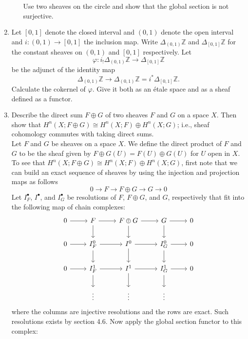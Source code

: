 \documentclass{article}
\newcommand{\zed}{\mathbb Z}
\begin{document}
\begin{enumerate}
\begin{enumerate}
Use two sheaves on the circle and show that the global section is not surjective.


\end{enumerate}
 \newpage
 \item 
Let $[0, 1]$ denote the closed interval and $(0, 1)$ denote the open
interval and $i: (0, 1) \to [0, 1]$ the inclusion map. Write $\Delta_{(0,1)}\zed$
and $\Delta_{[0,1]}\zed$ for the constant sheaves on $(0,1)$ and $[0,1]$ respectively. Let
$$\varphi: i_!\Delta_{(0,1)}\zed \to \Delta_{[0,1]}\zed$$
be the adjunct of the identity map
$$\Delta_{(0,1)}\zed \to \Delta_{(0,1)}\zed = i^*\Delta_{[0,1]}\zed.$$
Calculate the cokernel of $\varphi$. Give it both as an \'etale space and
as a sheaf defined as a functor.
\newpage
\item
Describe the direct sum $F\oplus G$ of two sheaves $F$ and $G$ on a space $X$.
Then show that $H^n(X;F\oplus G)\cong H^n(X;F)\oplus H^n(X;G)$; i.e., sheaf cohomology commutes with taking direct sums.\\

Let $F$ and $G$ be sheaves on a space $X$. We define the direct product of $F$ and $G$ to be the sheaf given by $F \oplus G (U) = F(U) \oplus G(U)$ for $U$ open in $X$. To see that $H^n(X;F\oplus G)\cong H^n(X;F)\oplus H^n(X;G)$, first note that we can build an exact sequence of sheaves by using the injection and projection maps as follows
\[0 \rightarrow F \rightarrow F \oplus G \rightarrow G \rightarrow 0 \]
Let $I^\bullet_F$, $I^\bullet$, and $I^\bullet_G$ be  resolutions of $F$, $F\oplus G$, and $G$, respectively that fit into the following map of chain complexes:
\[
\begin{tikzcd}
0 \arrow[r]
& F  \arrow[r] \arrow[d]
& F \oplus G  \arrow[r] \arrow[d]
& G \arrow[r] \arrow[d]
& 0  
\\
0 \arrow[r] 
& I^0_F \arrow[r] \arrow[d]
& I^0 \arrow[r] \arrow[d]
& I^0_G \arrow[r] \arrow[d]
& 0  
\\
0 \arrow[r]  
& I^1_F \arrow[r] \arrow[d]
& I^1 \arrow[r] \arrow[d]
& I^1_G \arrow[r] \arrow[d]
& 0  
\\
& \vdots 
& \vdots 
& \vdots
& 
\end{tikzcd}
\]
where the columns are injective resolutions and the rows are exact. Such resolutions exists by section 4.6. Now apply the global section functor to this complex: 


\end{enumerate}
\end{document}
